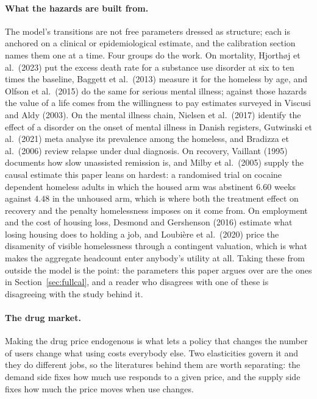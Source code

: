 \documentclass[10pt]{article}
\begin{document}
\paragraph{What the hazards are built from.} The model's transitions are not
free parameters dressed as structure; each is anchored on a clinical or
epidemiological estimate, and the calibration section names them one at a time. Four
groups do the work. On mortality, Hjorth\o j et al.\ (2023) put the excess death
rate for a substance use disorder at six to ten times the baseline, Baggett et al.\
(2013) measure it for the homeless by age, and Olfson et al.\ (2015) do the same for
serious mental illness; against those hazards the value of a life comes from the
willingness to pay estimates surveyed in Viscusi and Aldy (2003). On the mental
illness chain, Nielsen et al.\ (2017) identify the effect of a disorder on the onset
of mental illness in Danish registers, Gutwinski et al.\ (2021) meta analyse its
prevalence among the homeless, and Bradizza et al.\ (2006) review relapse under dual
diagnosis. On recovery, Vaillant (1995) documents how slow unassisted remission is,
and Milby et al.\ (2005) supply the causal estimate this paper leans on hardest: a
randomised trial on cocaine dependent homeless adults in which the housed arm was
abstinent $6.60$ weeks against $4.48$ in the unhoused arm, which is where both the
treatment effect on recovery and the penalty homelessness imposes on it come from. On
employment and the cost of housing loss, Desmond and Gershenson (2016) estimate what
losing housing does to holding a job, and Loubi\`ere et al.\ (2020) price the
disamenity of visible homelessness through a contingent valuation, which is what
makes the aggregate headcount enter anybody's utility at all. Taking these from
outside the model is the point: the parameters this paper argues over are the ones in
Section~\ref{sec:fullcal}, and a reader who disagrees with one of these is
disagreeing with the study behind it.

\paragraph{The drug market.} Making the drug price endogenous is what
lets a policy that changes the number of users change what using costs everybody
else. Two elasticities govern it and they do different jobs, so the literatures
behind them are worth separating: the demand side fixes how much use responds to a
given price, and the supply side fixes how much the price moves when use changes.
\end{document}
